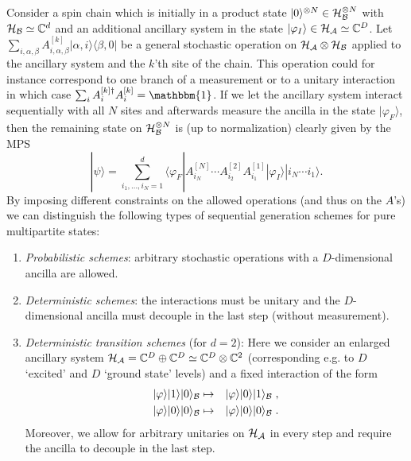 \documentclass[aps,prl,epsfig,graphics,floatfix,mathbbm,a4paper]{article}
\newcommand{\1}{\mathbbm{1}}
\renewcommand{\>}{\rangle}
\newcommand{\<}{\langle}
\begin{document}
Consider a spin chain which is initially in a product state
$|0\rangle^{\otimes N}\in {\cal H}_{\cal B}^{\otimes N}$ with
${\cal H}_{\cal B}\simeq\mathbb{C}^d$ and an additional ancillary
system in the state $ |\varphi_I\rangle\in{\cal H}_{\cal A}\simeq
    \mathbb{C}^D$. Let $\sum_{i,\alpha,\beta} A^{[k]}_{i,\alpha,\beta}
    |\alpha,i\rangle\langle\beta,0|$ be a general stochastic operation
on ${\cal H}_{\cal A}\otimes {\cal H}_{\cal B}$ applied to the
ancillary system and the $k$'th site of the chain. This operation
could for instance correspond to one branch of a measurement or to
a unitary interaction in which case $\sum_i
    A^{[k]\dag}_iA^{[k]}_i=\mathbbm{1}$. If we let the ancillary
system interact sequentially with all $N$ sites and afterwards
measure the ancilla in the state $|\varphi_F\rangle$, then the
remaining state on ${\cal H}_{\cal B}^{\otimes N}$ is (up to
normalization) clearly given by the MPS
\begin{equation}\label{OBCMPSgen}
    |\psi\rangle=\sum_{i_1,\ldots,i_N=1}^d
    \langle\varphi_F|A^{[N]}_{i_N}\cdots
    A^{[2]}_{i_{2}}A^{[1]}_{i_1}|\varphi_I\rangle|i_N\cdots
    i_1\rangle.
\end{equation}
By imposing different constraints on the allowed operations (and
thus on the $A$'s) we can distinguish the following types of
sequential generation schemes for pure multipartite states:
\begin{enumerate}
    \item \emph{Probabilistic schemes}: arbitrary stochastic operations with a $D$-dimensional ancilla are allowed.
    \item \emph{Deterministic schemes}: the interactions must be unitary and
          the $D$-dimensional ancilla must decouple in the last step (without measurement).
    \item \emph{Deterministic transition schemes} (for $d=2$): Here we
          consider an enlarged ancillary system ${\cal H}_{\cal A}=\mathbb{C}^D\oplus\mathbb{C}^D\simeq
              \mathbb{C}^D\otimes\mathbb{C}^2$ (corresponding e.g. to $D$ `excited' and $D$ `ground state'
          levels) and a fixed interaction of the form
          \begin{eqnarray}
              |\varphi\rangle|1\rangle|0\rangle_{\cal B} &\mapsto& |\varphi\rangle|0\rangle|1\rangle_{\cal
                  B}\nonumber\;,\\
              |\varphi\rangle|0\rangle|0\rangle_{\cal B} &\mapsto&
              |\varphi\rangle|0\rangle|0\rangle_{\cal
                  B}\nonumber\;.
          \end{eqnarray}
          Moreover, we allow for arbitrary unitaries on $\cal H_A$ in every
          step and require the ancilla to decouple in the last step.
\end{enumerate}
\end{document}
